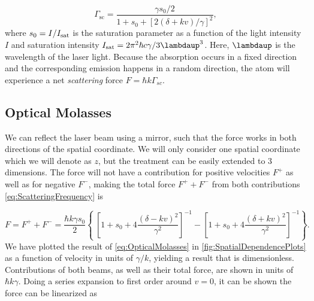 \begin{equation}\label{eq:ScatteringFrequency}
	\Gamma_{\text{sc}} = \frac{ \gamma s_0 /2}{1+s_0+\left[2(\delta+ k v)/\gamma\right]^2},
\end{equation}
where $s_0 = I/I_{\text{\text{sat}}}$ is the saturation parameter as a function of the light intensity $I$ and saturation intensity $I_{\text{sat}}=2\pi^2 \hbar c \gamma/3\lambdaup^3$. Here, $\lambdaup$ is the wavelength of the laser light.
Because the absorption occurs in a fixed direction and the corresponding emission happens in a random direction, the atom will experience a net \textit{scattering} force $F = \hbar k \Gamma_{sc}$.

\subsection{Optical Molasses}

We can reflect the laser beam using a mirror, such that the force works in both directions of the spatial coordinate.
We will only consider one spatial coordinate which we will denote as $z$, but the treatment can be easily extended to 3 dimensions.
The force will not have a contribution for positive velocities $F^+$ as well as for negative $F^-$, making the total force $F^+ + F^-$ from both contributions \cref{eq:ScatteringFrequency} is \cite{Kowalski2010}

\begin{equation}\label{eq:OpticalMolasses}
	F = F^+ + F^- = \frac{\hbar k \gamma s_0}{2}\left\{\
	\left[1 + s_0 + 4\frac{(\delta - kv)^2}{\gamma^2}\right]^{-1}-
	\left[1 + s_0 + 4\frac{(\delta + kv)^2}{\gamma^2}\right]^{-1}
	\right\}.
\end{equation}
We have plotted the result of \cref{eq:OpticalMolasses} in \cref{fig:SpatialDependencePlots} as a function of velocity in units of $\gamma / k$, yielding a result that is dimensionless. Contributions of both beams, as well as their total force, are shown in units of $\hbar k \gamma$.
Doing a series expansion to first order around $v = 0$, it can be shown the force can be linearized as \cite{Metcalf1999}


